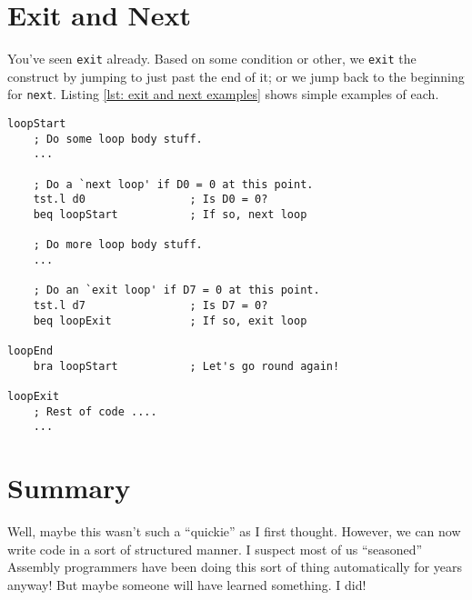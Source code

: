 \section{Exit and Next}

You've seen \texttt{exit} already. Based on some condition or other, we \texttt{exit} the construct by jumping to just past the end of it; or we jump back to the beginning for \texttt{next}. Listing \ref{lst: exit and next examples} shows simple examples of each.

\begin{lstlisting}[caption={EXIT and NEXT},label={lst: exit and next examples}]
loopStart
    ; Do some loop body stuff.
    ...
    
    ; Do a `next loop' if D0 = 0 at this point.
    tst.l d0                ; Is D0 = 0?
    beq loopStart           ; If so, next loop
    
    ; Do more loop body stuff.
    ...
    
    ; Do an `exit loop' if D7 = 0 at this point.
    tst.l d7                ; Is D7 = 0?
    beq loopExit            ; If so, exit loop  
    
loopEnd
    bra loopStart           ; Let's go round again!
    
loopExit
    ; Rest of code ....
    ...
\end{lstlisting}

\section{Summary}

Well, maybe this wasn't such a ``quickie'' as I first thought. However, we can now write code in a sort of structured manner. I suspect most of us ``seasoned'' Assembly programmers have been doing this sort of thing automatically for years anyway! But maybe someone will have learned something. I did!